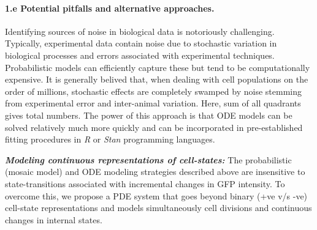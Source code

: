 \documentclass[11pt]{article}
\newcommand{\para}[1]{\vspace*{-4.5mm}\paragraph{#1}}
\newcommand{\blue}[1]{{\color{blue}{#1}}}
\begin{document}
\para{1.e Potential pitfalls and alternative approaches.}
Identifying sources of noise in biological data is notoriously challenging.
Typically, experimental data contain noise due to stochastic variation in biological processes and errors associated with experimental techniques.
Probabilistic models can efficiently capture these but tend to be computationally expensive.
It is generally belived that, when dealing with cell populations on the order of millions, stochastic effects are completely swamped by noise stemming from experimental error and inter-animal variation.
\blue{In such regimes, when age-classes in the mosaic model contain over thousands of cells, we will %
define ODE systems to predict their mean behavior, following central limit theorem. 
Essentially, we will divide each module in the age-class in four quadrants based on GFP and Ki67 status (+ve or -ve). %
We will initialize the ODE systems with pre-defined number of age classes ($A_0,\ldots,A_N$).
The ODE models will track movement of cells between the four quadrants and across the adjoining age-classes. %
We will also track fluxes among the modules.}
Here, sum of all quadrants gives total numbers. %
The power of this approach is that ODE models can be solved relatively much more quickly and can be incorporated in pre-established fitting procedures in \textit{R} or \textit{Stan} programming languages.

\textbf{\textit{Modeling continuous representations of cell-states:}}
The probabilistic (mosaic model) and ODE modeling strategies described above %
are insensitive to state-transitions associated with incremental changes in GFP intensity. 
To overcome this, we propose a PDE system that goes beyond binary (+ve v/s -ve) cell-state representations and models simultaneously cell divisions and continuous changes in internal states.
\end{document}
